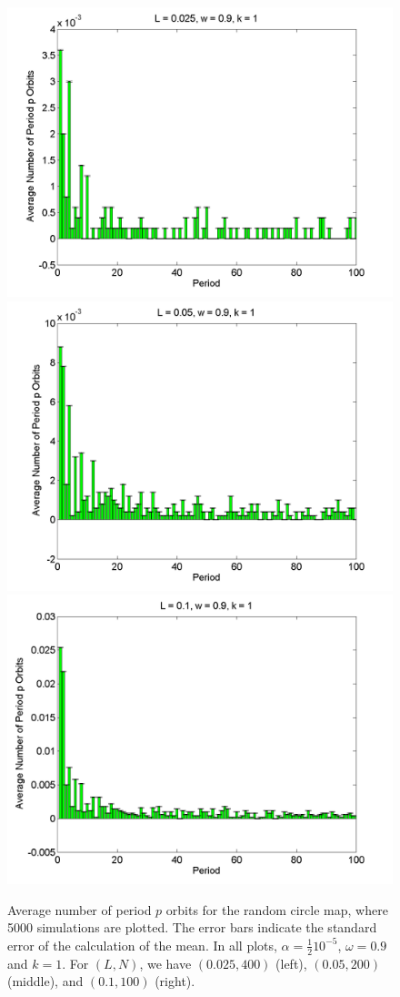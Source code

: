 \begin{figure}[H]\linespread{1}
\caption[Average number of period $p$ orbits for the random circle
map (normal distribution), for $\alpha = \frac{1}{2}10^{-5}$, $\omega=0.9$ and $k=1$]{Average number of period $p$ orbits for the random circle
map, where 5000 simulations are plotted. The error bars indicate
the standard error of the calculation of the mean. In all plots,
$\alpha = \frac{1}{2}10^{-5}$, $\omega=0.9$ and $k=1$. For $(L,N)$,
we have $(0.025, 400)$ (left), $(0.05, 200)$
(middle), and $(0.1, 100)$ (right).}\label{fig:rcirchist_n1_ha}
	\begin{center}
\includegraphics[width=.33\textwidth]{figs/rcirc_hist_n_halfa_L_0025_w_09_k_1_sims_5000.png}\hfill
\includegraphics[width=.33\textwidth]{figs/rcirc_hist_n_halfa_L_005_w_09_k_1_sims_5000.png}\hfill
\includegraphics[width=.33\textwidth]{figs/rcirc_hist_n_halfa_L_01_w_09_k_1_sims_5000.png}
	\end{center}
\end{figure}

